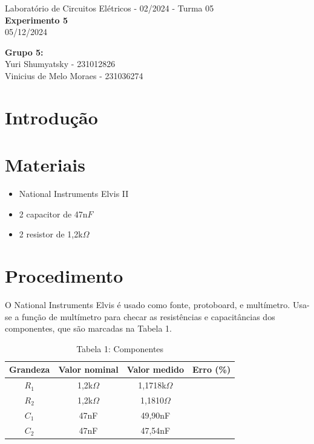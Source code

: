 \documentclass[a4 paper]{article}
\newcommand{\parag}{\hspace{30pt}}
\begin{document}
\justifying
\begin{center}{\large Laboratório de Circuitos Elétricos - 02/2024 - Turma 05}\\
{\large \textbf{Experimento 5}}\\ 
05/12/2024
\end{center}

\vspace{500pt}
 \noindent\textbf{Grupo 5:}\\
 Yuri Shumyatsky - 231012826\\
Vinicius de Melo Moraes - 231036274\\



\vspace{30pt}
\newpage

\section{Introdução}

\section{Materiais}


	\begin{itemize}
	\item National Instruments Elvis II
	\item 2 capacitor de 47n$F$
	\item 2 resistor de 1,2k$\Omega$
	
	\end{itemize}

\newpage

\section{Procedimento}

\parag O National Instruments Elvis é usado como fonte, protoboard, e multímetro. Usa-se a função de multímetro para checar as resistências e capacitâncias dos componentes, que são marcadas na Tabela 1.

\vspace{5pt}
\begin{table}[h]
\centering
\begin{tabular}{|c|c|c|c|}
\hline
Grandeza & Valor nominal & Valor medido & Erro (\%) \\\hline
$R_1$ & 1,2k$\Omega$ & 1,1718k$\Omega$ & \\\hline
$R_2$ & 1,2k$\Omega$ & 1,1810$\Omega$ & \\\hline
$C_1$ & 47nF & 49,90nF & \\\hline
$C_2$ & 47nF & 47,54nF & \\\hline
\end{tabular}
\caption*{Tabela 1: Componentes}
\end{table}
\end{document}
